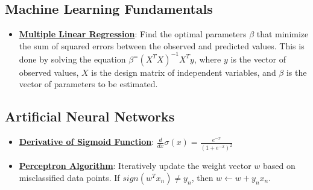 \documentclass{article}%
\begin{document}
%
\subsection{Machine Learning Fundamentals}%
\label{subsec:MachineLearningFundamentals}%
\begin{itemize}[leftmargin=*]%
\item \href{https://purdue.brightspace.com/d2l/common/assets/pdfjs-d2l-dist/1.0.14-legacy/web/viewer.html?file=\%2Fcontent\%2Fenforced\%2F1095467-wl.202510.CS.24300.001\%2F05L2-ML Basics.pdf\%3Fou\%3D1095467\&lang=en-us\&container=d2l-fileviewer-rendered-pdf\&fullscreen=d2l-fileviewer-rendered-pdf-dialog\&height=667#page=11}{\textbf{Multiple Linear Regression}}: Find the optimal parameters $\beta$ that minimize the sum of squared errors between the observed and predicted values. This is done by solving the equation $\beta^ = (X^TX)^{-1}X^Ty$, where $y$ is the vector of observed values, $X$ is the design matrix of independent variables, and $\beta$ is the vector of parameters to be estimated.%
\end{itemize}

%
\subsection{Artificial Neural Networks}%
\label{subsec:ArtificialNeuralNetworks}%
\begin{itemize}[leftmargin=*]%
\item \href{https://purdue.brightspace.com/d2l/common/assets/pdfjs-d2l-dist/1.0.14-legacy/web/viewer.html?file=\%2Fcontent\%2Fenforced\%2F1095467-wl.202510.CS.24300.001\%2F04L1-Linear Algebra Primer.pdf\%3Fou\%3D1095467\&lang=en-us\&container=d2l-fileviewer-rendered-pdf\&fullscreen=d2l-fileviewer-rendered-pdf-dialog\&height=667#page=21}{\textbf{Derivative of Sigmoid Function}}: $\frac{d}{dx} \sigma(x) = \frac{e^{-x}}{(1 + e^{-x})^2}$%
\item \href{https://purdue.brightspace.com/d2l/common/assets/pdfjs-d2l-dist/1.0.14-legacy/web/viewer.html?file=\%2Fcontent\%2Fenforced\%2F1095467-wl.202510.CS.24300.001\%2F05L2-ML Basics.pdf\%3Fou\%3D1095467\&lang=en-us\&container=d2l-fileviewer-rendered-pdf\&fullscreen=d2l-fileviewer-rendered-pdf-dialog\&height=667#page=30}{\textbf{Perceptron Algorithm}}: Iteratively update the weight vector $w$ based on misclassified data points. If $sign(w^Tx_n) \ne y_n$, then $w \leftarrow w + y_nx_n$.%
\end{itemize}

%
\end{document}
